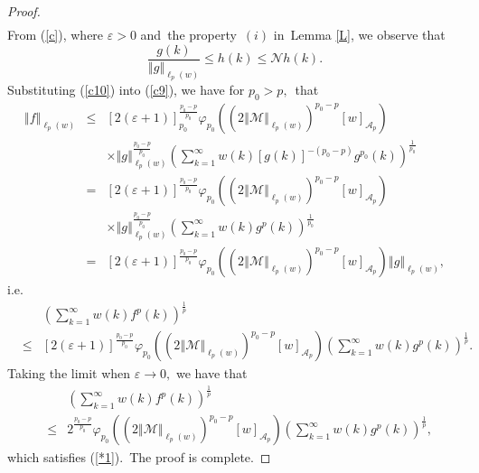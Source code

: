 \documentclass[a4paper]{amsart}
\theoremstyle{plain}
\numberwithin{equation}{section}
\begin{document}
\begin{proof}
\begin{eqnarray}
\end{eqnarray}%
From (\ref{c}), where $\varepsilon >0$ and\ the property\ $(i)$ in\ Lemma %
\ref{L}, we observe that%
\begin{equation}
\frac{g(k)}{\left\Vert g\right\Vert _{\ell _{p}(w)}}\leq h(k)\leq \mathcal{N}%
h(k).  \label{c10}
\end{equation}%
Substituting (\ref{c10}) into (\ref{c9}), we have for $p_{0}>p,$\ that%
\begin{eqnarray*}
\left\Vert f\right\Vert _{\ell _{p}(w)} &\leq &\left[ 2\left( \varepsilon
+1\right) \right] _{p_{0}}^{\frac{p_{0}-p}{p_{0}}}\mathcal{\varphi }%
_{p_{0}}\left( \left( 2\left\Vert \mathcal{M}\right\Vert _{\ell
_{p}(w)}\right) ^{p_{0}-p}\left[ w\right] _{\mathcal{A}_{p}}\right) \\
&&\times \left\Vert g\right\Vert _{\ell _{p}(w)}^{\frac{p_{0}-p}{p_{0}}%
}\left( \sum_{k=1}^{\infty }w(k)\left[ g(k)\right] ^{-\left( p_{0}-p\right)
}g^{p_{0}}(k)\right) ^{\frac{1}{p_{0}}} \\
&=&\left[ 2\left( \varepsilon +1\right) \right] ^{\frac{p_{0}-p}{p_{0}}}%
\mathcal{\varphi }_{p_{0}}\left( \left( 2\left\Vert \mathcal{M}\right\Vert
_{\ell _{p}(w)}\right) ^{p_{0}-p}\left[ w\right] _{\mathcal{A}_{p}}\right) \\
&&\times \left\Vert g\right\Vert _{\ell _{p}(w)}^{\frac{p_{0}-p}{p_{0}}%
}\left( \sum_{k=1}^{\infty }w(k)g^{p}(k)\right) ^{\frac{1}{p_{0}}} \\
&=&\left[ 2\left( \varepsilon +1\right) \right] ^{\frac{p_{0}-p}{p_{0}}}%
\mathcal{\varphi }_{p_{0}}\left( \left( 2\left\Vert \mathcal{M}\right\Vert
_{\ell _{p}(w)}\right) ^{p_{0}-p}\left[ w\right] _{\mathcal{A}_{p}}\right)
\left\Vert g\right\Vert _{\ell _{p}(w)},
\end{eqnarray*}%
i.e.%
\begin{eqnarray*}
&&\left( \sum_{k=1}^{\infty }w(k)f^{p}(k)\right) ^{\frac{1}{p}} \\
&\leq &\left[ 2\left( \varepsilon +1\right) \right] ^{\frac{p_{0}-p}{p_{0}}}%
\mathcal{\varphi }_{p_{0}}\left( \left( 2\left\Vert \mathcal{M}\right\Vert
_{\ell _{p}(w)}\right) ^{p_{0}-p}\left[ w\right] _{\mathcal{A}_{p}}\right)
\left( \sum_{k=1}^{\infty }w(k)g^{p}(k)\right) ^{\frac{1}{p}}.
\end{eqnarray*}%
Taking the limit when $\varepsilon \rightarrow 0,$ we have that%
\begin{eqnarray*}
&&\left( \sum_{k=1}^{\infty }w(k)f^{p}(k)\right) ^{\frac{1}{p}} \\
&\leq &2^{\frac{p_{0}-p}{p_{0}}}\mathcal{\varphi }_{p_{0}}\left( \left(
2\left\Vert \mathcal{M}\right\Vert _{\ell _{p}(w)}\right) ^{p_{0}-p}\left[ w%
\right] _{\mathcal{A}_{p}}\right) \left( \sum_{k=1}^{\infty
}w(k)g^{p}(k)\right) ^{\frac{1}{p}},
\end{eqnarray*}%
which satisfies (\ref{*1}).\ The proof is complete.
\end{proof}
\end{document}
